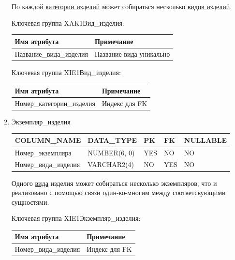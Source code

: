 \begin{enumerate}
\begin{tabular}{|p{7cm}|p{3cm}|p{1cm}|p{1cm}|p{3cm}|}
    \end{tabular}

    По каждой \underline{категории изделий} может собираться несколько \underline{видов изделий}.

    Ключевая группа XAK1Вид\_изделия:

    \begin{tabular}{|p{7cm}|p{9.3cm}|} \hline

        {\bf Имя атрибута} & {\bf Примечание} \\ \hline
        Название\_вида\_изделия & Название вида уникально \\ \hline

    \end{tabular}

    Ключевая группа XIE1Вид\_изделия:

    \begin{tabular}{|p{7cm}|p{9.3cm}|} \hline

        {\bf Имя атрибута} & {\bf Примечание} \\ \hline
        Номер\_категории\_изделия & Индекс для FK \\ \hline

    \end{tabular}

    \item{Экземпляр\_изделия}

    \begin{tabular}{|p{7cm}|p{3cm}|p{1cm}|p{1cm}|p{3cm}|} \hline

        {\bf COLUMN\_NAME} & {\bf DATA\_TYPE} & {\bf PK} & {\bf FK} & {\bf NULLABLE} \\ \hline
        Номер\_экземпляра & NUMBER(6, 0) & YES & NO & NO \\ \hline
        Номер\_вида\_изделия & VARCHAR2(4) & NO & YES & NO \\ \hline

    \end{tabular}

    Одного \underline{вида} изделия может собираться несколько экземпляров, что и реализовано с помощью связи один-ко-многим между соответсвующими сущностями.

    Ключевая группа XIE1Экземпляр\_изделия:

    \begin{tabular}{|p{7cm}|p{9.3cm}|} \hline

        {\bf Имя атрибута} & {\bf Примечание} \\ \hline
        Номер\_вида\_изделия & Индекс для FK \\ \hline


\end{tabular}
\end{enumerate}
